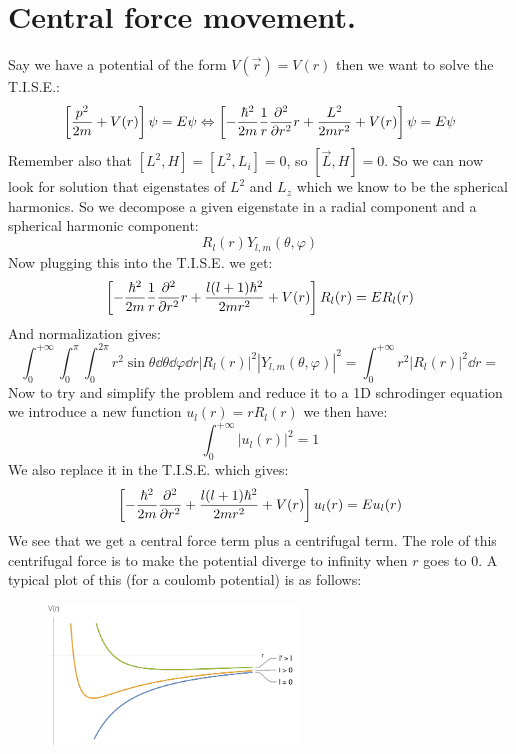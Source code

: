 \documentclass[10pt,a4paper]{book}
\begin{document}
\section{Central force movement.}
Say we have a potential of the form $V(\vec{r}) = V(r)$ then we want to solve the T.I.S.E.:
\[
\left[ \frac{p^2}{2m} + V(r) \right] \psi = E \psi \Leftrightarrow \left[ -\frac{\hbar^2}{2m} \frac{1}{r} \pdv[2]{}{r} r + \frac{L^2}{2m r^2} + V(r) \right]\psi = E \psi
\]
Remember also that $[L^2, H] = [L^2, L_i] = 0$, so $[\vec{L}, H] = 0$. So we can now look for solution that eigenstates of $L^2$ and $L_z$ which we know to be the spherical harmonics. So we decompose a given eigenstate in a radial component and a spherical harmonic component:
\[
R_l(r) Y_{l, m}(\theta, \varphi)
\]
Now plugging this into the T.I.S.E. we get:
\[
\left[ - \frac{\hbar^2}{2m} \frac{1}{r} \pdv[2]{}{r} r + \frac{l (l+1) \hbar^2}{2m r^2} + V(r) \right]R_l(r) = E R_l(r)
\]
And normalization gives:
\[\int_0^{+\infty} \int_{0}^\pi \int_{0}^{2\pi} r^2 \sin\theta\dd\theta \dd\varphi\dd r |R_l(r)|^2 |Y_{l,m}(\theta, \varphi)|^2 = \int_{0}^{+\infty} r^2 |R_l(r)|^2 \dd r = 
\]
Now to try and simplify the problem and reduce it to a 1D schrodinger equation we introduce a new function $u_l(r) = r R_l(r)$ we then have:
\[
\int_0^{+\infty} |u_l(r)|^2 = 1
\]
We also replace it in the T.I.S.E. which gives:
\[
\left[-\frac{\hbar^2}{2m} \pdv[2]{}{r} + \frac{l (l + 1) \hbar^2}{2m r^2} + V(r) \right] u_l(r) = E u_l(r)
\]
We see that we get a central force term plus a centrifugal term. The role of this centrifugal force is to make the potential diverge to infinity when $r$ goes to 0. A typical plot of this (for a coulomb potential) is as follows:
\begin{figure}[h!]
\centering
\includegraphics[width=0.6\textwidth]{graphs/center_force_potential}
\end{figure}
\end{document}
